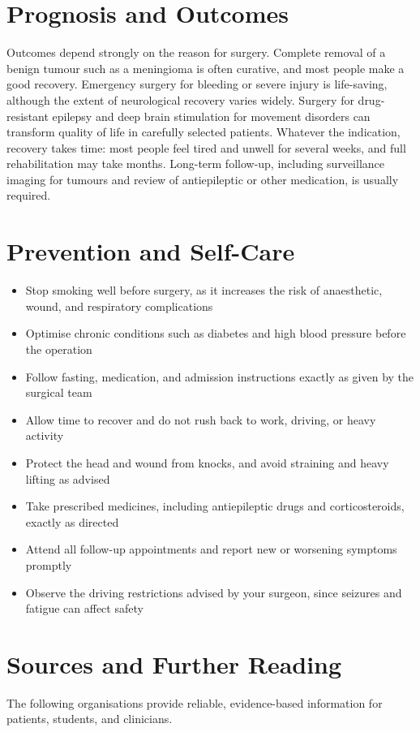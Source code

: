 \section*{Prognosis and Outcomes}
Outcomes depend strongly on the reason for surgery. Complete removal of a benign tumour such as a meningioma is often curative, and most people make a good recovery. Emergency surgery for bleeding or severe injury is life-saving, although the extent of neurological recovery varies widely. Surgery for drug-resistant epilepsy and deep brain stimulation for movement disorders can transform quality of life in carefully selected patients. Whatever the indication, recovery takes time: most people feel tired and unwell for several weeks, and full rehabilitation may take months. Long-term follow-up, including surveillance imaging for tumours and review of antiepileptic or other medication, is usually required.

\section*{Prevention and Self-Care}
\begin{itemize}
    \item Stop smoking well before surgery, as it increases the risk of anaesthetic, wound, and respiratory complications
    \item Optimise chronic conditions such as diabetes and high blood pressure before the operation
    \item Follow fasting, medication, and admission instructions exactly as given by the surgical team
    \item Allow time to recover and do not rush back to work, driving, or heavy activity
    \item Protect the head and wound from knocks, and avoid straining and heavy lifting as advised
    \item Take prescribed medicines, including antiepileptic drugs and corticosteroids, exactly as directed
    \item Attend all follow-up appointments and report new or worsening symptoms promptly
    \item Observe the driving restrictions advised by your surgeon, since seizures and fatigue can affect safety
\end{itemize}

\section*{Sources and Further Reading}
The following organisations provide reliable, evidence-based information for patients, students, and clinicians.

